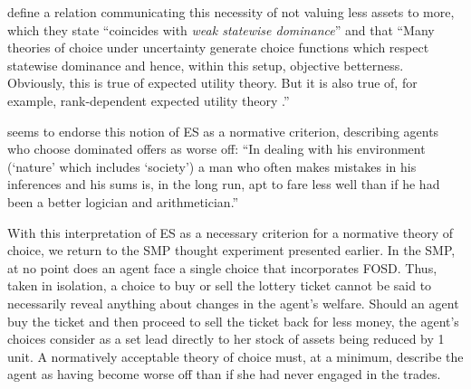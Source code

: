 \documentclass[../main.tex]{subfiles}
\begin{document}
\addtocounter{footnote}{-2}

\textcite[141]{Cubitt2001} define a relation communicating this necessity of not valuing less assets to more, which they state \enquote{coincides with \textit{weak statewise dominance}} and that
\enquote{Many theories of choice under uncertainty generate choice functions which respect statewise dominance and hence, within this setup, objective betterness.
	Obviously, this is true of expected utility theory.
	But it is also true of, for example, \textcite{Quiggin1982} rank-dependent expected utility theory .}

\textcite[112]{Marschak1950} seems to endorse this notion of ES as a normative criterion, describing agents who choose dominated offers as worse off:
\enquote{In dealing with his environment (\enquote{nature} which includes \enquote{society}) a man who often makes mistakes in his inferences and his sums is, in the long run, apt to fare less well than if he had been a better logician and arithmetician.}

With this interpretation of ES as a necessary criterion for a normative theory of choice, we return to the SMP thought experiment presented earlier.
In the SMP, at no point does an agent face a single choice that incorporates FOSD.
Thus, taken in isolation, a choice to buy or sell the lottery ticket cannot be said to necessarily reveal anything about changes in the agent's welfare.
Should an agent buy the ticket and then proceed to sell the ticket back for less money, the agent's choices consider as a set lead directly to her stock of assets being reduced by 1 unit.
A normatively acceptable theory of choice must, at a minimum, describe the agent as having become worse off than if she had never engaged in the trades.
\end{document}

